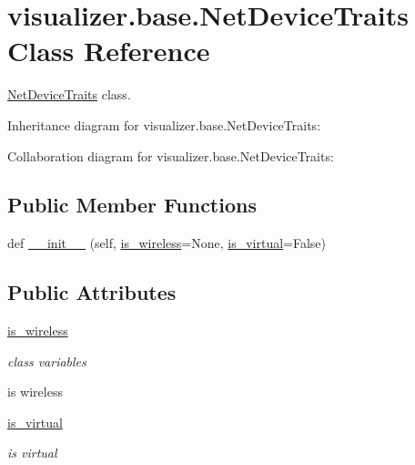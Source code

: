 \hypertarget{classvisualizer_1_1base_1_1NetDeviceTraits}{}\section{visualizer.\+base.\+Net\+Device\+Traits Class Reference}
\label{classvisualizer_1_1base_1_1NetDeviceTraits}


\hyperlink{classvisualizer_1_1base_1_1NetDeviceTraits}{Net\+Device\+Traits} class.  




Inheritance diagram for visualizer.\+base.\+Net\+Device\+Traits\+:


Collaboration diagram for visualizer.\+base.\+Net\+Device\+Traits\+:
\subsection*{Public Member Functions}
\begin{DoxyCompactItemize}
\item 
def \hyperlink{classvisualizer_1_1base_1_1NetDeviceTraits_a055d7014aaf481d14df4024527a3c119}{\+\_\+\+\_\+init\+\_\+\+\_\+} (self, \hyperlink{classvisualizer_1_1base_1_1NetDeviceTraits_ab47e1d82868ef9c5c04b4fba6060b903}{is\+\_\+wireless}=None, \hyperlink{classvisualizer_1_1base_1_1NetDeviceTraits_acaac18d58139cf512544a293f64cad0a}{is\+\_\+virtual}=False)
\end{DoxyCompactItemize}
\subsection*{Public Attributes}
\begin{DoxyCompactItemize}
\item 
\hyperlink{classvisualizer_1_1base_1_1NetDeviceTraits_ab47e1d82868ef9c5c04b4fba6060b903}{is\+\_\+wireless}
\begin{DoxyCompactList}\small\item\em class variables

is wireless \end{DoxyCompactList}\item 
\hyperlink{classvisualizer_1_1base_1_1NetDeviceTraits_acaac18d58139cf512544a293f64cad0a}{is\+\_\+virtual}
\begin{DoxyCompactList}\small\item\em is virtual \end{DoxyCompactList}\end{DoxyCompactItemize}


